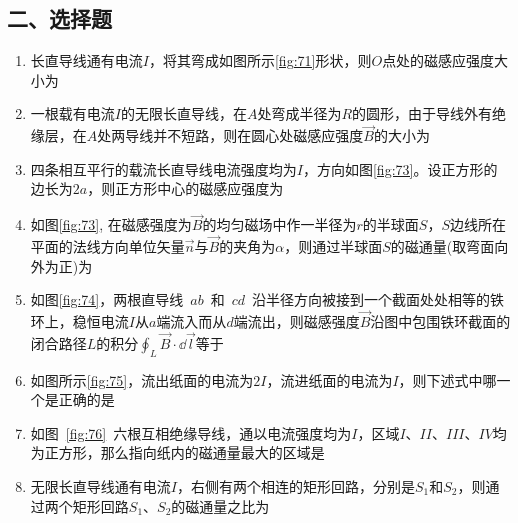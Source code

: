 \subsection*{二、选择题}
\begin{enumerate}
    \item 长直导线通有电流$I$，将其弯成如图所示\ref{fig:71}形状，则$O$点处的磁感应强度大小为~\spaces
    \item 一根载有电流$I$的无限长直导线，在$A$处弯成半径为$R$的圆形，由于导线外有绝缘层，在$A$处两导线并不短路，则在圆心处磁感应强度$\vec{B}$的大小为~\spaces

    \item 四条相互平行的载流长直导线电流强度均为$I$，方向如图\ref{fig:73}。设正方形的边长为$2a$，则正方形中心的磁感应强度为~\spaces
    \item 如图\ref{fig:73}, 在磁感强度为$\vec{B}$的均匀磁场中作一半径为$r$的半球面$S$，$S$边线所在平面的法线方向单位矢量$\vec{n}$与$\vec{B}$的夹角为$\alpha$，则通过半球面$S$的磁通量(取弯面向外为正)为~\spaces
    \item 如图\ref{fig:74}，两根直导线~$ab$~和~$cd$~沿半径方向被接到一个截面处处相等的铁环上，稳恒电流$I$从$a$端流入而从$d$端流出，则磁感强度$\vec{B}$沿图中包围铁环截面的闭合路径$L$的积分$\oint_L \vec{B}\cdot \dd \vec{l}$等于~\spaces
    \item 如图所示\ref{fig:75}，流出纸面的电流为$2I$，流进纸面的电流为$I$，则下述式中哪一个是正确的是~\spaces
    \item 如图~\ref{fig:76}~六根互相绝缘导线，通以电流强度均为$I$，区域$I$、$II$、$III$、$IV$均为正方形，那么指向纸内的磁通量最大的区域是~\spaces
    \item 无限长直导线通有电流$I$，右侧有两个相连的矩形回路，分别是$S_1$和$S_2$，则通过两个矩形回路$S_1$、$S_2$的磁通量之比为~\spaces
\end{enumerate}
